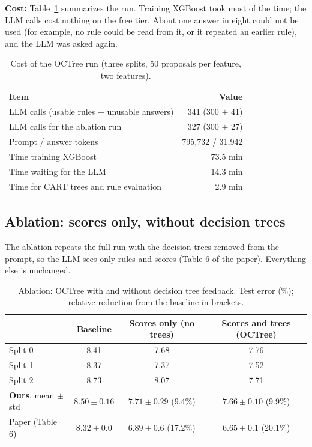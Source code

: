 \documentclass[11pt]{article}
\begin{document}
\textbf{Cost:} Table~\ref{tab:cost} summarizes the run. Training XGBoost took most of the time; the
LLM calls cost nothing on the free tier. About one answer in eight could not be used (for example, no rule could be read from it, or it
repeated an earlier rule), and the LLM was asked again.

\begin{table}[H]
\centering
\caption{Cost of the OCTree run (three splits, 50 proposals per feature, two features).}
\label{tab:cost}
\begin{tabular}{@{}lr@{}}
\toprule
Item & Value \\
\midrule
LLM calls (usable rules $+$ unusable answers) & 341 (300 $+$ 41) \\
LLM calls for the ablation run & 327 (300 $+$ 27) \\
Prompt / answer tokens & 795,732 / 31,942 \\
Time training XGBoost & 73.5 min \\
Time waiting for the LLM & 14.3 min \\
Time for CART trees and rule evaluation & 2.9 min \\
\bottomrule
\end{tabular}
\end{table}

\subsection{Ablation: scores only, without decision trees}
The ablation repeats the full run with the decision trees removed from the prompt, so the LLM sees
only rules and scores (Table 6 of the paper). Everything else is unchanged.

\begin{table}[H]
\centering
\caption{Ablation: OCTree with and without decision tree feedback. Test error (\%); relative
reduction from the baseline in brackets.}
\label{tab:ablation}
\begin{tabular}{@{}lccc@{}}
\toprule
 & Baseline & Scores only (no trees) & Scores and trees (OCTree) \\
\midrule
Split 0 & 8.41 & 7.68 & 7.76 \\
Split 1 & 8.37 & 7.37 & 7.52 \\
Split 2 & 8.73 & 8.07 & 7.71 \\
\midrule
\textbf{Ours}, mean $\pm$ std & $8.50\pm0.16$ & $7.71\pm0.29$ (9.4\%) & $7.66\pm0.10$ (9.9\%) \\
Paper (Table 6) & $8.32\pm0.0$ & $6.89\pm0.6$ (17.2\%) & $6.65\pm0.1$ (20.1\%) \\
\bottomrule
\end{tabular}
\end{table}
\end{document}
